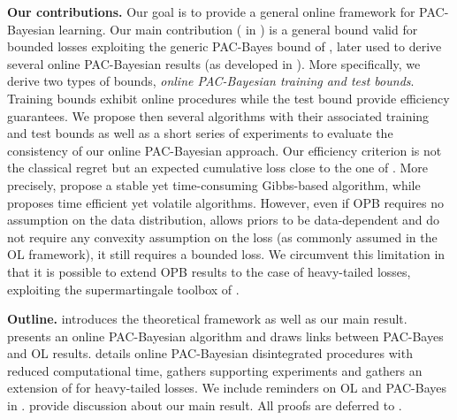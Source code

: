 \textbf{Our contributions.} Our goal is to provide a general online framework for PAC-Bayesian learning. Our main contribution ( in ) is a general bound  valid for bounded losses exploiting the generic PAC-Bayes bound of \citet{rivasplata2020pac}, later used to derive several online PAC-Bayesian results (as developed in ).
More specifically, we derive two types of bounds, \emph{online PAC-Bayesian training and test bounds}.
Training bounds exhibit online procedures while the test bound provide efficiency guarantees. We propose then several algorithms with their associated training and test bounds as well as a short series of experiments to evaluate the consistency of our online PAC-Bayesian approach. Our efficiency criterion is not the classical regret but an expected cumulative loss close to the one of \citet{wintenberger2021stochastic}. More precisely,  propose a stable yet time-consuming Gibbs-based algorithm, while  proposes time efficient yet volatile algorithms.
However, even if OPB requires no assumption on the data distribution, allows priors to be data-dependent and do not require any convexity assumption on the loss (as commonly assumed in the OL framework), it still requires a bounded loss. We circumvent this limitation in  that it is possible to extend OPB results to the case of heavy-tailed losses, exploiting the supermartingale toolbox of .

\textbf{Outline.}  introduces the  theoretical framework as well as our main result.  presents an online PAC-Bayesian algorithm and draws links between PAC-Bayes and OL results.
 details online PAC-Bayesian disintegrated procedures with reduced computational time,  gathers supporting experiments and  gathers an extension of  for heavy-tailed losses.
We include reminders on OL and PAC-Bayes in .  provide discussion about our main result. All proofs are deferred to .

